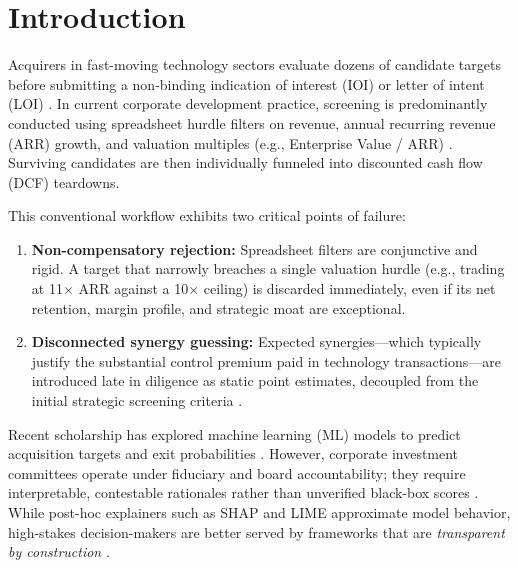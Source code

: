 \documentclass[conference]{IEEEtran}
\begin{document}
\section{Introduction}
Acquirers in fast-moving technology sectors evaluate dozens of candidate targets before submitting a non-binding indication of interest (IOI) or letter of intent (LOI) \cite{hasan2020mergers}. In current corporate development practice, screening is predominantly conducted using spreadsheet hurdle filters on revenue, annual recurring revenue (ARR) growth, and valuation multiples (e.g., Enterprise Value / ARR) \cite{sirower1997synergy}. Surviving candidates are then individually funneled into discounted cash flow (DCF) teardowns.

This conventional workflow exhibits two critical points of failure:
\begin{enumerate}
    \item \textbf{Non-compensatory rejection:} Spreadsheet filters are conjunctive and rigid. A target that narrowly breaches a single valuation hurdle (e.g., trading at 11$\times$ ARR against a 10$\times$ ceiling) is discarded immediately, even if its net retention, margin profile, and strategic moat are exceptional.
    \item \textbf{Disconnected synergy guessing:} Expected synergies---which typically justify the substantial control premium paid in technology transactions---are introduced late in diligence as static point estimates, decoupled from the initial strategic screening criteria \cite{damodaran2005value, sirower1997synergy}.
\end{enumerate}

Recent scholarship has explored machine learning (ML) models to predict acquisition targets and exit probabilities \cite{shrestha2019organizational}. However, corporate investment committees operate under fiduciary and board accountability; they require interpretable, contestable rationales rather than unverified black-box scores \cite{rudin2019stop}. While post-hoc explainers such as SHAP and LIME \cite{lundberg2017unified, ribeiro2016why} approximate model behavior, high-stakes decision-makers are better served by frameworks that are \textit{transparent by construction} \cite{rudin2019stop, doshivelez2017towards}.
\end{document}
